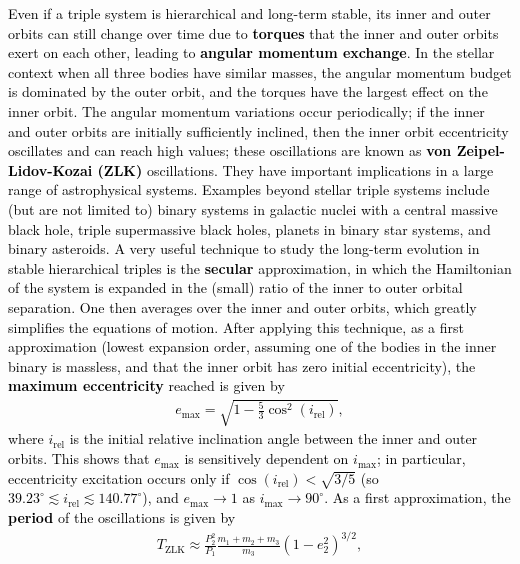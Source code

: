 \documentclass[main.tex]{subfiles}
\begin{document}
\begin{tcolorbox}[sharp corners, colback=blue!30, colframe=blue!80!blue, title=Box \refstepcounter{educhap3}\label{boxchap3:dynV}\ref{boxchap3:dynV} -- Orbital dynamics V]
\par \textcolor{black}{Even if a triple system is hierarchical and long-term stable, its inner and outer orbits can still change over time due to {\bf torques} that the inner and outer orbits exert on each other, leading to {\bf angular momentum exchange}. In the stellar context when all three bodies have similar masses, the angular momentum budget is dominated by the outer orbit, and the torques have the largest effect on the inner orbit. The angular momentum variations occur periodically; if the inner and outer orbits are initially sufficiently inclined, then the inner orbit eccentricity oscillates and can reach high values; these oscillations are known as  {\bf von Zeipel-Lidov-Kozai (ZLK)} oscillations. They have important implications in a large range of astrophysical systems. Examples beyond stellar triple systems include (but are not limited to) binary systems in galactic nuclei with a central massive black hole, triple supermassive black holes, planets in binary star systems, and binary asteroids.
A very useful technique to study the long-term evolution in stable hierarchical triples is the {\bf secular} approximation, in which the Hamiltonian of the system is expanded in the (small) ratio of the inner to outer orbital separation. One then averages over the inner and outer orbits, which greatly simplifies the equations of motion. After applying this technique, as a first approximation (lowest expansion order, assuming one of the bodies in the inner binary is massless, and that the inner orbit has zero initial eccentricity), the {\bf maximum eccentricity} reached is given by
\begin{align}
\label{eq:ZLK_emax}
e_\mathrm{max} = \sqrt{1-\frac{5}{3}\cos^2 (i_\mathrm{rel})},
\end{align}
where $i_\mathrm{rel}$ is the initial relative inclination angle between the inner and outer orbits. This shows that $e_\mathrm{max}$ is sensitively dependent on $i_\mathrm{max}$; in particular,  eccentricity excitation occurs only if $\cos(i_\mathrm{rel}) < \sqrt{3/5}$ (so $39.23^\circ \lesssim i_\mathrm{rel} \lesssim 140.77^\circ$), and $e_\mathrm{max} \rightarrow 1$ as $i_\mathrm{max} \rightarrow 90^\circ$. As a first approximation, the {\bf period} of the oscillations is given by
\begin{align}
T_\mathrm{ZLK} \approx \frac{P_2^2}{P_1} \frac{m_1+m_2+m_3}{m_3} \left(1-e_2^2 \right )^{3/2},

\end{align}}
\end{tcolorbox}
\end{document}
